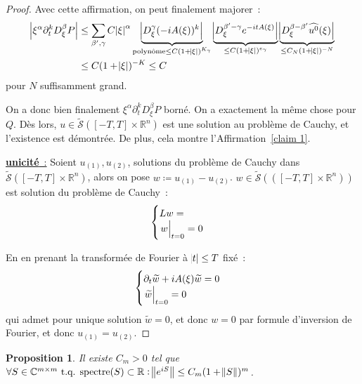 \documentclass{report}
\DeclareMathOperator{\spectreOperator}{spectre\!}
\newcommand{\C}{{\mathbb C}}
\newcommand{\R}{{\mathbb R}}
\newcommand{\tq}{\text{ t.q. }}
\newcommand{\st}{\tq}
\newcommand{\spectre}[1]{{\spectreOperator\left(#1\right)}}
\newcommand{\restr}[2]{\left.#1\vphantom{\big|}\right|_{#2}}
\newcommand{\unic}{{\underline {\textbf{unicité}~:}} }
\newtheorem{prp}[thm]{Proposition}
\theoremstyle{definition}
\theoremstyle{remark}
\begin{document}
\begin{proof}
Avec cette affirmation, on peut finalement majorer~:
\begin{align*}
	\abs {\xi^\alpha\partial_t^kD_\xi^\beta P}
	&\leq \sum_{\beta',\gamma}C\abs \xi^\alpha\underbrace {\abs {D_\xi^\gamma (-iA(\xi))^k}}_{\text{polynôme} \leq C(1+\abs\xi)^{K_\gamma}}\underbrace {\abs {D_\xi^{\beta'-\gamma}e^{-itA(\xi)}}}_{\leq C(1+\abs\xi)^{e_\gamma}}\underbrace {\abs {D_\xi^{\beta-\beta'}\widehat {u^0}(\xi)}}_{\leq C_N(1+\abs\xi)^{-N}} \\
	&\leq C(1+\abs\xi)^{-K} \leq C
\end{align*}
pour $N$ suffisamment grand.

On a donc bien finalement $\xi^\alpha\partial_t^kD_\xi^\beta P$ borné. On a exactement la même chose pour $Q$. Dès lors, $u \in \widetilde {\mathcal S}([-T, T] \times \R^n)$ est
une solution au problème de Cauchy, et l'existence est démontrée. De plus, cela montre l'Affirmation~\ref{claim 1}.

\unic Soient $u_{(1)}, u_{(2)}$, solutions du problème de Cauchy dans $\widetilde {\mathcal S}([-T, T] \times \R^n)$, alors on pose $w \coloneqq u_{(1)} - u_{(2)}$.
$w \in \widetilde {\mathcal S}(([-T, T] \times \R^n))$ est solution du problème de Cauchy~:
\[\begin{cases}Lw = \\\restr w{t=0} = 0\end{cases}\]

En en prenant la transformée de Fourier à $\abs t \leq T$ fixé~:
\[\begin{cases}\partial_t\widetilde w + iA(\xi)\widetilde w = 0\\\restr {\widetilde w}{t=0} = 0\end{cases}\]
qui admet pour unique solution $\widetilde w = 0$, et donc $w = 0$ par formule d'inversion de Fourier, et donc $u_{(1)} = u_{(2)}$.
\end{proof}

\begin{prp} Il existe $C_m > 0$ tel que $\forall S \in \C^{m \times m} \st \spectre S \subset \R : \norm {e^{iS}} \leq C_m(1+\norm S)^m$.
\end{prp}
\end{document}
